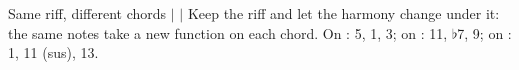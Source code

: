\begin{patternbox}{Same riff, different chords}{ $|$  $|$ }
Keep the riff  and let the harmony change under it:
the same notes take a new function on each chord.
On : 5, 1, 3; on : 11, $\flat$7, 9; on : 1, 11 (sus), 13.
\patternwhereline
\end{patternbox}
